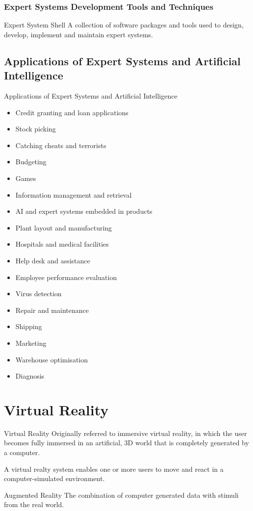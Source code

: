 \documentclass[\main/notes.tex]{subfiles}
\begin{document}
				\subsubsection{Expert Systems Development Tools and Techniques}
					\begin{definition}{Expert System Shell}
						A collection of software packages and tools used to design, develop, implement and maintain expert systems.
					\end{definition}
			\subsection{Applications of Expert Systems and Artificial Intelligence}
				\begin{sidenote}{Applications of Expert Systems and Artificial Intelligence}
					\begin{multicols}{2}
						\begin{itemize}[nosep]
							\item Credit granting and loan applications
							\item Stock picking
							\item Catching cheats and terrorists
							\item Budgeting
							\item Games
							\item Information management and retrieval
							\item AI and expert systems embedded in products
							\item Plant layout and manufacturing
							\item Hospitals and medical facilities
							\item Help desk and assistance
							\item Employee performance evaluation
							\item Virus detection
							\item Repair and maintenance
							\item Shipping
							\item Marketing
							\item Warehouse optimisation
							\item Diagnosis
						\end{itemize}
					\end{multicols}
				\end{sidenote}

		\section{Virtual Reality}
			\begin{definition}{Virtual Reality}
				Originally referred to immersive virtual reality, in which the user becomes fully immersed in an artificial, 3D world that is completely generated by a computer.

				A virtual realty system enables one or more users to move and react in a computer-simulated environment.
			\end{definition}
			\begin{definition}{Augmented Reality}
				The combination of computer generated data with stimuli from the real world.
			\end{definition}
\end{document}
